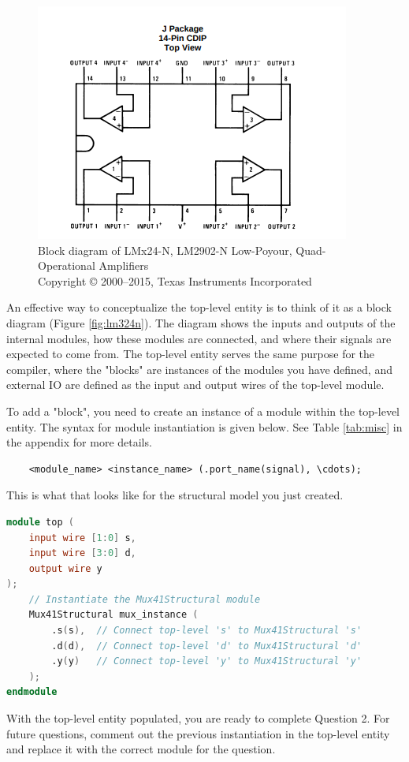 \documentclass[12pt]{journal}
\begin{document}
\begin{figure}
    \centering
    \includegraphics[width=0.5\linewidth]{image_2024-09-26_224700848.png}
    \caption{Block diagram of LMx24-N, LM2902-N Low-Poyour, Quad-Operational Amplifiers \\
    \tiny{Copyright © 2000–2015, Texas Instruments Incorporated}}
    \label{fig:lm324n}
\end{figure}

An effective way to conceptualize the top-level entity is to think of it as a block diagram (Figure \vref{fig:lm324n}). The diagram shows the inputs and outputs of the internal modules, how these modules are connected, and where their signals are expected to come from. The top-level entity serves the same purpose for the compiler, where the "blocks" are instances of the modules you have defined, and external IO are defined as the input and output wires of the top-level module.

To add a "block", you need to create an instance of a module within the top-level entity. The syntax for module instantiation is given below. See Table \vref{tab:misc} in the appendix for more details.
\begin{lstlisting}
    <module_name> <instance_name> (.port_name(signal), \cdots);
\end{lstlisting}
This is what that looks like for the structural model you just created.

\begin{lstlisting}[language=verilog]
module top (
    input wire [1:0] s,
    input wire [3:0] d,
    output wire y
);
    // Instantiate the Mux41Structural module
    Mux41Structural mux_instance (
        .s(s),  // Connect top-level 's' to Mux41Structural 's'
        .d(d),  // Connect top-level 'd' to Mux41Structural 'd'
        .y(y)   // Connect top-level 'y' to Mux41Structural 'y'
    );
endmodule
\end{lstlisting}

With the top-level entity populated, you are ready to complete Question 2. For future questions, comment out the previous instantiation in the top-level entity and replace it with the correct module for the question.
\end{document}
